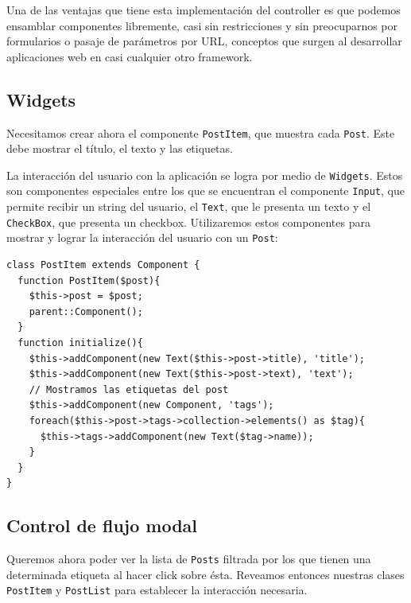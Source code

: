 Una de las ventajas que tiene esta implementación del controller es que podemos ensamblar componentes libremente, casi sin restricciones y sin preocuparnos por formularios o pasaje de parámetros por URL, conceptos que surgen al desarrollar aplicaciones web en casi cualquier otro framework.

\subsection{Widgets}
\label{sub-widget}

Necesitamos crear ahora el componente \verb'PostItem', que muestra cada \verb'Post'. Este debe mostrar el título, el texto y las etiquetas.

La interacción del usuario con la aplicación se logra por medio de \verb"Widgets"\cite{WDGTS}. Estos son componentes especiales entre los que se encuentran el componente \verb"Input", que permite recibir un string del usuario, el \verb"Text", que le presenta un texto y el \verb"CheckBox", que presenta un checkbox. Utilizaremos estos componentes para mostrar y lograr la interacción del usuario con un \verb'Post':

\begin{verbatim}
class PostItem extends Component {
  function PostItem($post){
    $this->post = $post;
    parent::Component();
  }
  function initialize(){
    $this->addComponent(new Text($this->post->title), 'title');
    $this->addComponent(new Text($this->post->text), 'text');
    // Mostramos las etiquetas del post
    $this->addComponent(new Component, 'tags');
    foreach($this->post->tags->collection->elements() as $tag){
      $this->tags->addComponent(new Text($tag->name));
    }
  }
}
\end{verbatim}

\subsection{Control de flujo modal}
\label{sub-modal-flow}
Queremos ahora poder ver la lista de \verb"Posts" filtrada por los que tienen una determinada etiqueta al hacer click sobre ésta. Reveamos entonces nuestras clases \verb"PostItem" y \verb"PostList" para establecer la interacción necesaria.


